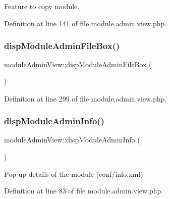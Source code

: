 Feature to copy module. 



Definition at line 141 of file module.\+admin.\+view.\+php.

\hypertarget{classmoduleAdminView_a71cf5716a6b8d0dde832c2e171518bdd}{}\label{classmoduleAdminView_a71cf5716a6b8d0dde832c2e171518bdd} 
\subsubsection{\texorpdfstring{disp\+Module\+Admin\+File\+Box()}{dispModuleAdminFileBox()}}
{\footnotesize\ttfamily module\+Admin\+View\+::disp\+Module\+Admin\+File\+Box (\begin{DoxyParamCaption}{ }\end{DoxyParamCaption})}



Definition at line 299 of file module.\+admin.\+view.\+php.

\hypertarget{classmoduleAdminView_abb4989ee97d80a1f9a04a3f8364807c0}{}\label{classmoduleAdminView_abb4989ee97d80a1f9a04a3f8364807c0} 
\subsubsection{\texorpdfstring{disp\+Module\+Admin\+Info()}{dispModuleAdminInfo()}}
{\footnotesize\ttfamily module\+Admin\+View\+::disp\+Module\+Admin\+Info (\begin{DoxyParamCaption}{ }\end{DoxyParamCaption})}



Pop-\/up details of the module (conf/info.\+xml) 



Definition at line 83 of file module.\+admin.\+view.\+php.

\hypertarget{classmoduleAdminView_af7dbb67dd855f4acb840b6ffbdf4a80c}{}\label{classmoduleAdminView_af7dbb67dd855f4acb840b6ffbdf4a80c} 

